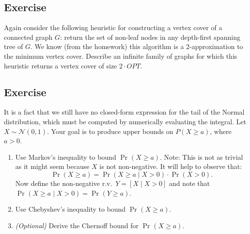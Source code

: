 \documentclass[14pt]{extreport}
\newcounter{counter}
\newcommand{\Exercise}{Exercise \stepcounter{counter}\thecounter}
\renewcommand{\Pr}[2][]{\operatorname{Pr}_{#1}\left(#2\right)}
\begin{document}
\subsection*{\Exercise}
    Again consider the following heuristic for constructing a vertex cover of a connected graph $G$: return the set of non-leaf nodes in any depth-first spanning tree of $G$. We know (from the homework) this algorithm is a 2-approximation to the minimum vertex cover. Describe an infinite family of graphs for which this heuristic returns a vertex cover of size $2 \cdot OPT$.

\subsection*{\Exercise}
    It is a fact that we still have no closed-form expression for the tail of the Normal distribution, which must be computed by numerically evaluating the integral. Let \(X \sim \mathcal{N}(0,1)\). Your goal is to produce upper bounds on \(P(X \geq a)\), where \(a > 0\).
    \begin{enumerate}
        \item Use Markov's inequality to bound \(\Pr{X \geq a}\). Note: This is not as trivial as it might seem because \(X\) is not non-negative. It will help to observe that:
        \[
        \Pr{X \geq a} = \Pr{X \geq a \mid X > 0} \cdot \Pr{X > 0}.
        \]
        Now define the non-negative r.v.\ \( Y = [X \mid X > 0] \) and note that \(\Pr{X \geq a \mid X > 0} = \Pr{Y \geq a}\).
        \item Use Chebyshev’s inequality to bound \(\Pr{X \geq a}\).
        \item \textit{(Optional)} Derive the Chernoff bound for \(\Pr{X \geq a}\).
    \end{enumerate}
\end{document}
